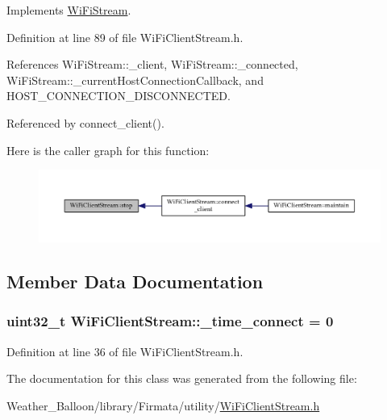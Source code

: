 Implements \hyperlink{class_wi_fi_stream_a9438b7e07eae9f8a42af9060e7b330c7}{Wi\+Fi\+Stream}.



Definition at line 89 of file Wi\+Fi\+Client\+Stream.\+h.



References Wi\+Fi\+Stream\+::\+\_\+client, Wi\+Fi\+Stream\+::\+\_\+connected, Wi\+Fi\+Stream\+::\+\_\+current\+Host\+Connection\+Callback, and H\+O\+S\+T\+\_\+\+C\+O\+N\+N\+E\+C\+T\+I\+O\+N\+\_\+\+D\+I\+S\+C\+O\+N\+N\+E\+C\+T\+ED.



Referenced by connect\+\_\+client().



Here is the caller graph for this function\+:\nopagebreak
\begin{figure}[H]
\begin{center}
\leavevmode
\includegraphics[width=350pt]{class_wi_fi_client_stream_ac81b72c8c61f10a5f950d9deabc7ffeb_icgraph}
\end{center}
\end{figure}




\subsection{Member Data Documentation}
\subsubsection[{\texorpdfstring{\+\_\+time\+\_\+connect}{\_time\_connect}}]{\setlength{\rightskip}{0pt plus 5cm}uint32\+\_\+t Wi\+Fi\+Client\+Stream\+::\+\_\+time\+\_\+connect = 0\hspace{0.3cm}{\ttfamily [protected]}}\hypertarget{class_wi_fi_client_stream_a9d0a90467736b552cd89b5eec494ef50}{}\label{class_wi_fi_client_stream_a9d0a90467736b552cd89b5eec494ef50}


Definition at line 36 of file Wi\+Fi\+Client\+Stream.\+h.



The documentation for this class was generated from the following file\+:\begin{DoxyCompactItemize}
\item 
Weather\+\_\+\+Balloon/library/\+Firmata/utility/\hyperlink{_wi_fi_client_stream_8h}{Wi\+Fi\+Client\+Stream.\+h}\end{DoxyCompactItemize}
